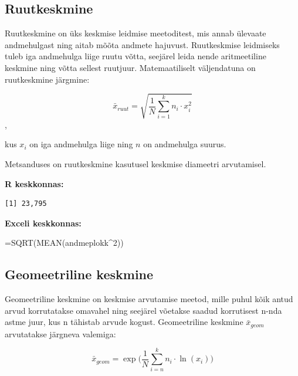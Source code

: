 \documentclass[
]{book}
\newenvironment{Shaded}{\begin{snugshade}}{\end{snugshade}}
\newcommand{\CommentTok}[1]{\textcolor[rgb]{0.56,0.35,0.01}{\textit{#1}}}
\newcommand{\DecValTok}[1]{\textcolor[rgb]{0.00,0.00,0.81}{#1}}
\newcommand{\FunctionTok}[1]{\textcolor[rgb]{0.13,0.29,0.53}{\textbf{#1}}}
\newcommand{\NormalTok}[1]{#1}
\newcommand{\SpecialCharTok}[1]{\textcolor[rgb]{0.81,0.36,0.00}{\textbf{#1}}}
\renewenvironment{Shaded} {\begin{snugshade}\footnotesize} {\end{snugshade}}
\begin{document}
\subsection{Ruutkeskmine}\label{ruutkeskmine}

Ruutkeskmine on üks keskmise leidmise meetoditest, mis annab ülevaate andmehulgast ning aitab mõõta andmete hajuvust. Ruutkeskmise leidmiseks tuleb iga andmehulga liige ruutu võtta, seejärel leida nende aritmeetiline keskmine ning võtta sellest ruutjuur. Matemaatiliselt väljendatuna on ruutkeskmine järgmine:

\[ \bar x_{ruut}=\sqrt{\frac{1}{N}\sum_{i=1}^{k}n_i \cdot x_i^2} \],

kus \(x_{i}\) on iga andmehulga liige ning \(n\) on andmehulga suurus.

Metsanduses on ruutkeskmine kasutusel keskmise diameetri arvutamisel.

\textbf{R keskkonnas:}

\begin{Shaded}
\end{Shaded}

\begin{verbatim}
[1] 23,795
\end{verbatim}

\textbf{Exceli keskkonnas:}

\begin{naideExcel}
=SQRT(MEAN(andmeplokk^2))

\end{naideExcel}

\subsection{Geomeetriline keskmine}\label{geomeetriline-keskmine}

Geomeetriline keskmine on keskmise arvutamise meetod, mille puhul kõik antud arvud korrutatakse omavahel ning seejärel võetakse saadud korrutisest n-nda astme juur, kus n tähistab arvude kogust. Geomeetriline keskmine \(\bar x_{geom}\) arvutatakse järgneva valemiga:

\[\bar x_{geom}=\exp \biggl( \frac{1}{N}\sum_{i=n}^k n_i \cdot \ln(x_i) \biggr) \]
\end{document}
